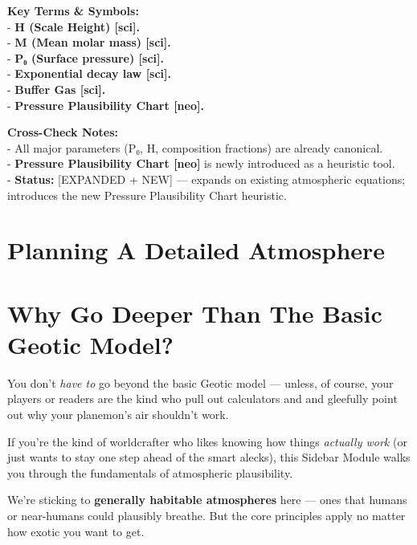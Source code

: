 \documentclass[
  letterpaper,
]{book}
\begin{document}
\textbf{Key Terms \& Symbols:}\\
- \textbf{H (Scale Height) {[}sci{]}.}\\
- \textbf{M (Mean molar mass) {[}sci{]}.}\\
- \textbf{P₀ (Surface pressure) {[}sci{]}.}\\
- \textbf{Exponential decay law {[}sci{]}.}\\
- \textbf{Buffer Gas {[}sci{]}.}\\
- \textbf{Pressure Plausibility Chart {[}neo{]}.}

\textbf{Cross-Check Notes:}\\
- All major parameters (P₀, H, composition fractions) are already
canonical.\\
- \textbf{Pressure Plausibility Chart {[}neo{]}} is newly introduced as
a heuristic tool.\\
- \textbf{Status:} {[}EXPANDED + NEW{]} --- expands on existing
atmospheric equations; introduces the new Pressure Plausibility Chart
heuristic.

\chapter{Planning A Detailed
Atmosphere}\label{planning-a-detailed-atmosphere}

\chapter{Why Go Deeper Than The Basic Geotic
Model?}\label{why-go-deeper-than-the-basic-geotic-model}

You don't \emph{have to} go beyond the basic Geotic model --- unless, of
course, your players or readers are the kind who pull out calculators
and and gleefully point out why your planemon's air shouldn't work.

If you're the kind of worldcrafter who likes knowing how things
\emph{actually work} (or just wants to stay one step ahead of the smart
alecks), this Sidebar Module walks you through the fundamentals of
atmospheric plausibility.

We're sticking to \textbf{generally habitable atmospheres} here --- ones
that humans or near-humans could plausibly breathe. But the core
principles apply no matter how exotic you want to get.
\end{document}
